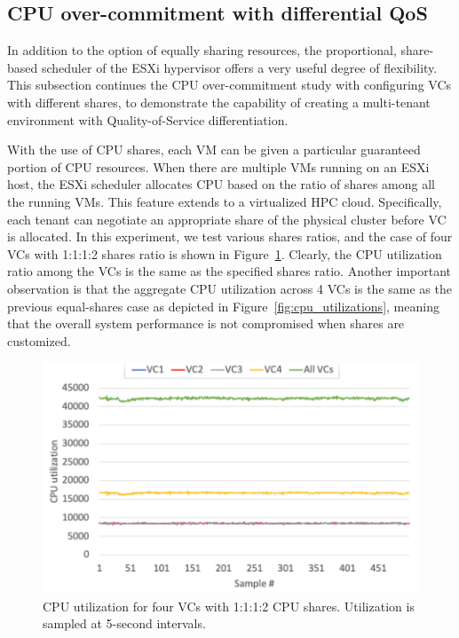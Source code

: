 \subsection{CPU over-commitment with differential QoS}
In addition to the option of equally sharing resources, the proportional, share-based scheduler of the ESXi hypervisor offers a very useful degree of flexibility. This subsection continues the CPU over-commitment study with configuring VCs with different shares, to demonstrate the capability of creating a multi-tenant environment with Quality-of-Service differentiation. 

With the use of CPU shares, each VM can be given a particular guaranteed portion of CPU resources. When there are multiple VMs running on an ESXi host, the ESXi scheduler allocates CPU based on the ratio of shares among all the running VMs. This feature extends to a virtualized HPC cloud. Specifically, each tenant can negotiate an appropriate share of the physical cluster before VC is allocated. In this experiment, we test various shares ratios, and the case of four VCs with 1:1:1:2 shares ratio is shown in Figure~\ref{fig:share_utilization}. Clearly, the CPU utilization ratio among the VCs is the same as the specified shares ratio. Another important observation is that the aggregate CPU utilization across 4 VCs is the same as the previous equal-shares case as depicted in Figure~\ref{fig:cpu_utilizations}, meaning that the overall system performance is not compromised when shares are customized.


\begin{figure}[!t]
   \begin{center}
       \includegraphics[width=\columnwidth]{Figures/share_utilization.pdf}
   \end{center}
   \caption{CPU utilization for four VCs with 1:1:1:2 CPU shares. Utilization is sampled at 5-second intervals.}
   \label{fig:share_utilization}
 \end{figure}







